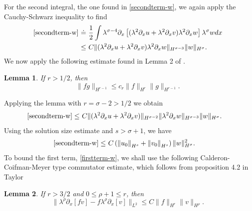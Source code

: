 \documentclass[reqno]{amsart}
\theoremstyle{plain}
\newtheorem{lemma}{Lemma}[section]
\numberwithin{equation}{section}
\begin{document}
For the second integral, the one found in \eqref{secondterm-w}, we again apply the Cauchy-Schwarz inequality to find 
 \begin{align}    
 \eqref{secondterm-w}\ \dot=  & \ 
   \frac12  \int \lambda^{\sigma-4}    \partial_x \left[    ( \lambda^2 \partial_x u +\lambda^2  \partial_xv) \lambda^2  \partial_x w   \right ]    \lambda^\sigma w dx 
  \\  \le & \
 C \|( \lambda^2 \partial_x u +\lambda^2  \partial_xv) \lambda^2  \partial_x w  \|_{H^{\sigma - 3} }
 \| w  \|_{H^{\sigma } }. 
\end{align}
We now apply the following estimate found in Lemma 2 of \cite{himonasholmes}. 
\begin{lemma}\label{HH}
    If $r>1/2$, then 
    $$ \| fg\|_{H^{r-1}} \le c_r \| f\|_{H^r}\|g\|_{H^{r-1}}. 
    $$
\end{lemma}
Applying the lemma with $r = \sigma - 2>1/2$ we obtain 
 \begin{align}    
 \eqref{secondterm-w} 
    \le & \ 
 C \|( \lambda^2 \partial_x u +\lambda^2  \partial_xv) \|_{H^{\sigma - 2} }  \|  \lambda^2  \partial_x w  \|_{H^{\sigma - 3} }
 \| w  \|_{H^{\sigma } }. 
\end{align}
Using the solution size estimate and $s > \sigma +1 $, we have 
 \begin{align}    
 \eqref{secondterm-w} 
    \le & \ C \left(  \left\| u_0   \right\| _{H^{s} }  +  \left\| v_0   \right\| _{H^{s} } \right)  
  \|w\|_{H^\sigma} ^2 . 
\end{align}
To bound the first term, \eqref{firstterm-w}, we shall use the following Calderon-Coifman-Meyer type commutator estimate, which follows from proposition 4.2 in Taylor \cite{taylor}
\begin{lemma}\label{ccm}
    If $r>3/2$ and $0\le \rho+1 \le r $, then 
    $$
    \| \lambda^\rho\partial_x [fv] - f \lambda^\rho\partial_x [v]\|_{L^2 } \le C \| f\|_{H^r } \| v\|_{H^\rho }.
    $$
\end{lemma}
\end{document}
